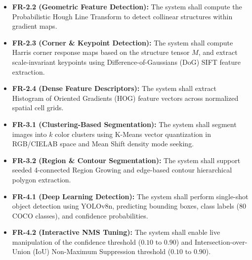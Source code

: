 \begin{itemize}
    \item \textbf{FR-2.2 (Geometric Feature Detection):} The system shall compute the Probabilistic Hough Line Transform to detect collinear structures within gradient maps.
    \item \textbf{FR-2.3 (Corner \& Keypoint Detection):} The system shall compute Harris corner response maps based on the structure tensor $M$, and extract scale-invariant keypoints using Difference-of-Gaussians (DoG) SIFT feature extraction.
    \item \textbf{FR-2.4 (Dense Feature Descriptors):} The system shall extract Histogram of Oriented Gradients (HOG) feature vectors across normalized spatial cell grids.
    \item \textbf{FR-3.1 (Clustering-Based Segmentation):} The system shall segment images into $k$ color clusters using K-Means vector quantization in RGB/CIELAB space and Mean Shift density mode seeking.
    \item \textbf{FR-3.2 (Region \& Contour Segmentation):} The system shall support seeded 4-connected Region Growing and edge-based contour hierarchical polygon extraction.
    \item \textbf{FR-4.1 (Deep Learning Detection):} The system shall perform single-shot object detection using YOLOv8n, predicting bounding boxes, class labels (80 COCO classes), and confidence probabilities.
    \item \textbf{FR-4.2 (Interactive NMS Tuning):} The system shall enable live manipulation of the confidence threshold ($0.10$ to $0.90$) and Intersection-over-Union (IoU) Non-Maximum Suppression threshold ($0.10$ to $0.90$).
\end{itemize}


